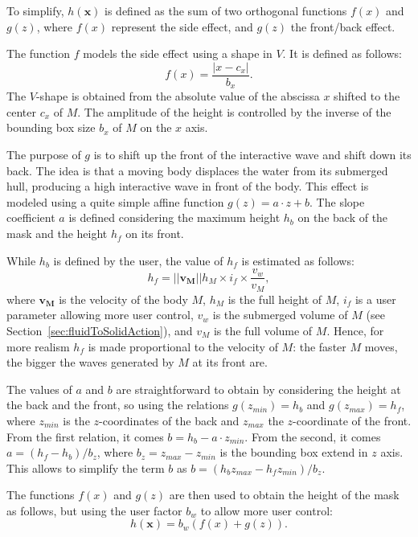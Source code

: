 \documentclass[final]{jcgt}
\begin{document}
To simplify, $h(\mathbf x)$ is defined as the sum of two orthogonal functions $f(x)$ and $g(z)$,
where $f(x)$ represent the side effect, and $g(z)$ the front/back effect.

The function $f$ models the side effect using a shape in $V$.
It is defined as follows:
\begin{equation}
	f(x) = \frac{\left|x-c_x\right|}{b_x}.
\end{equation}
The $V$-shape is obtained from the absolute value of the abscissa $x$ shifted to the center $c_x$ of $M$.
The amplitude of the height is controlled by the inverse of the bounding box size $b_x$ of $M$ on the $x$ axis.

The purpose of $g$ is to shift up the front of the interactive wave and shift down its back.
The idea is that a moving body displaces the water from its submerged hull, producing a high interactive wave in front of the body.
This effect is modeled using a quite simple affine function $g(z)=a\cdot z+b$.
The slope coefficient $a$ is defined considering the maximum height $h_b$ on the back of the mask and the height $h_f$ on its front.

While $h_b$ is defined by the user, the value of $h_f$ is estimated as follows:
\begin{equation}
	h_f = ||\mathbf{v_M}||h_{M}\times i_f\times\frac{v_w}{v_{M}},
\end{equation}
where $\mathbf{v_M}$ is the velocity of the body $M$, $h_M$ is the full height of $M$, $i_f$ is a user parameter allowing more user control, $v_w$ is the submerged volume of $M$ (see Section~\ref{sec:fluidToSolidAction}), and $v_{M}$ is the full volume of $M$.
Hence, for more realism $h_f$ is made proportional to the velocity of $M$:
the faster $M$ moves, the bigger the waves generated by $M$ at its front are.

The values of $a$ and $b$ are straightforward to obtain by considering the height at the back and the front, so using the relations $g(z_{min})=h_b$ and $g(z_{max})=h_f$,
where $z_{min}$ is the $z$-coordinates of the back and $z_{max}$ the $z$-coordinate of the front.
From the first relation, it comes $b=h_b-a\cdot z_{min}$.
From the second, it comes $a=\left(h_f-h_b\right)/b_z$, where $b_z=z_{max}-z_{min}$ is the bounding box extend in $z$ axis.
This allows to simplify the term $b$ as $b=\left(h_bz_{max}-h_fz_{min}\right)/b_z$.

The functions $f(x)$ and $g(z)$ are then used to obtain the height of the mask as follows,
but using the user factor $b_w$ to allow more user control:
\begin{equation}
	h(\mathbf x)=b_w\left(f(x)+g(z)\right).
\end{equation}
\end{document}
